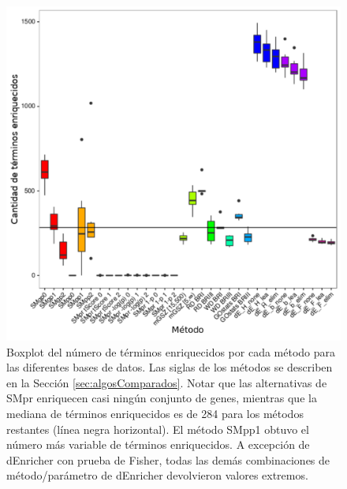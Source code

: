 \documentclass[12pt,twoside]{reedthesis}
\begin{document}
\begin{figure}

{\centering \includegraphics[width=1\linewidth]{images/IFA_FIG1_es} 

}

\caption{Boxplot del número de términos enriquecidos por cada método para las diferentes bases de datos. Las siglas de los métodos se describen en la Sección \ref{sec:algosComparados}. Notar que las alternativas de SMpr enriquecen casi ningún conjunto de genes, mientras que la mediana de términos enriquecidos es de 284 para los métodos restantes (línea negra horizontal). El método SMpp1 obtuvo el número más variable de términos enriquecidos. A excepción de dEnricher con prueba de Fisher, todas las demás combinaciones de método/parámetro de dEnricher devolvieron valores extremos.}\label{fig:ifa1}
\end{figure}


\par
\end{document}
